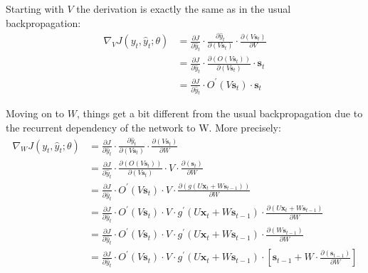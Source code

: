 Starting with $V$ the derivation is exactly the same as in the usual backpropagation:
{\setlength{\jot}{5pt}
\begin{align*}
\nabla_V J(y_t, \hat{y}_t ; \theta)& = \frac{\partial J}{\partial \hat{y}_t}
\cdot \frac{\partial \hat{y}_t}{\partial (V \boldsymbol{s}_{t})} \cdot \frac{\partial (V \boldsymbol{s}_{t})}{\partial V} \\
& = \frac{\partial J}{\partial \hat{y}_t}
\cdot \frac{ \partial ( O(V \boldsymbol{s}_{t}))}{\partial (V\boldsymbol{s}_{t})} \cdot \boldsymbol{s}_{t}\\
& = \frac{\partial J}{\partial \hat{y}_t} \cdot O^\prime(V \boldsymbol{s}_{t}) \cdot \boldsymbol{s}_{t}
\end{align*}}

Moving on to $W$, things get a bit different from the usual backpropagation due to the recurrent dependency of the
network to W. More precisely: \v
\begingroup
\allowdisplaybreaks
{\setlength{\jot}{5pt}
\begin{align*}
\nabla_W J(y_t, \hat{y}_t ; \theta)& = \frac{\partial J}{\partial \hat{y}_t}
\cdot \frac{\partial \hat{y}_t}{\partial (V \boldsymbol{s}_{t})} \cdot \frac{\partial (V\boldsymbol{s}_{t})}{\partial W} \\
&= \frac{\partial J}{\partial \hat{y}_t} \cdot \frac{ \partial ( O(V\boldsymbol{s}_{t}))}{\partial (V\boldsymbol{s}_{t})}
\cdot V \cdot \frac{\partial (\boldsymbol{s}_{t})} {\partial W} \\
&= \frac{\partial J}{\partial \hat{y}_t} \cdot O^\prime(V\boldsymbol{s}_{t})
\cdot V \cdot \frac{\partial (g(U \boldsymbol{x}_{t} + W \boldsymbol{s}_{t-1}))} {\partial W} \\
&= \frac{\partial J}{\partial \hat{y}_t} \cdot O^\prime(V \boldsymbol{s}_{t})
\cdot V \cdot g^\prime(U \boldsymbol{x}_{t} + W \boldsymbol{s}_{t-1})
\cdot \frac{\partial (U\boldsymbol{x}_{t} + W \boldsymbol{s}_{t-1})} {\partial W} \\
& = \frac{\partial J}{\partial \hat{y}_t} \cdot O^\prime(V\boldsymbol{s}_{t})
\cdot V \cdot g^\prime(U \boldsymbol{x}_{t} + W \boldsymbol{s}_{t-1})
\cdot \frac{\partial (W\boldsymbol{s}_{t-1})} {\partial W} \\
& = \frac{\partial J}{\partial \hat{y}_t} \cdot O^\prime(V \boldsymbol{s}_{t})
\cdot V \cdot g^\prime(U \boldsymbol{x}_{t} + W \boldsymbol{s}_{t-1})
\cdot \left[ \boldsymbol{s}_{t-1} + W \cdot \frac{\partial(\boldsymbol{s}_{t-1})} {\partial W} \right]
\end{align*}}
\endgroup

